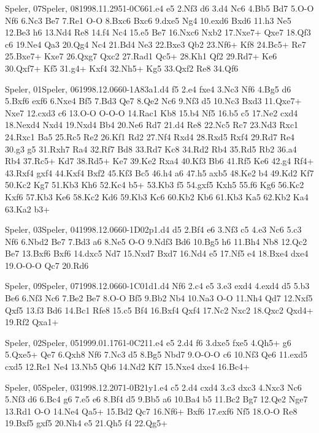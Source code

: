 \documentclass[twocolumn,a4paper,10pt]{report}
\begin{document}
\begin{chessgame}{Speler, 07}{Speler, 08}{1998.11.29}{5}{1-0}{C66}{1.e4 e5 2.Nf3 d6 3.d4 Nc6 4.Bb5 Bd7 5.O-O Nf6 6.Nc3 Be7 7.Re1 O-O 8.Bxc6 Bxc6 9.dxe5 Ng4 10.exd6 Bxd6 11.h3 Ne5 12.Be3 h6 13.Nd4 Re8 14.f4 Nc4 15.e5 Be7 16.Nxc6 Nxb2 17.Nxe7+ Qxe7 18.Qf3 c6 19.Ne4 Qa3 20.Qg4 Nc4 21.Bd4 Ne3 22.Bxe3 Qb2 23.Nf6+ Kf8 24.Bc5+ Re7 25.Bxe7+ Kxe7 26.Qxg7 Qxc2 27.Rad1 Qc5+ 28.Kh1 Qf2 29.Rd7+ Ke6 30.Qxf7+ Kf5 31.g4+ Kxf4 32.Nh5+ Kg5 33.Qxf2 Re8 34.Qf6\mate}\end{chessgame}
\begin{chessgame}{Speler, 01}{Speler, 06}{1998.12.06}{6}{0-1}{A83a}{1.d4 f5 2.e4 fxe4 3.Nc3 Nf6 4.Bg5 d6 5.Bxf6 exf6 6.Nxe4 Bf5 7.Bd3 Qe7 8.Qe2 Nc6 9.Nf3 d5 10.Nc3 Bxd3 11.Qxe7+ Nxe7 12.cxd3 c6 13.O-O O-O-O 14.Rac1 Kb8 15.b4 Nf5 16.b5 c5 17.Ne2 cxd4 18.Nexd4 Nxd4 19.Nxd4 Bb4 20.Ne6 Rd7 21.d4 Re8 22.Nc5 Rc7 23.Nd3 Rxc1 24.Rxc1 Ba5 25.Rc5 Re2 26.Kf1 Rd2 27.Nf4 Rxd4 28.Rxd5 Rxf4 29.Rd7 Re4 30.g3 g5 31.Rxh7 Ra4 32.Rf7 Bd8 33.Rd7 Kc8 34.Rd2 Rb4 35.Rd5 Rb2 36.a4 Rb4 37.Rc5+ Kd7 38.Rd5+ Ke7 39.Ke2 Rxa4 40.Kf3 Bb6 41.Rf5 Ke6 42.g4 Rf4+ 43.Rxf4 gxf4 44.Kxf4 Bxf2 45.Kf3 Bc5 46.h4 a6 47.h5 axb5 48.Ke2 b4 49.Kd2 Kf7 50.Kc2 Kg7 51.Kb3 Kh6 52.Kc4 b5+ 53.Kb3 f5 54.gxf5 Kxh5 55.f6 Kg6 56.Kc2 Kxf6 57.Kb3 Ke6 58.Kc2 Kd6 59.Kb3 Kc6 60.Kb2 Kb6 61.Kb3 Ka5 62.Kb2 Ka4 63.Ka2 b3+}\end{chessgame}
\begin{chessgame}{Speler, 03}{Speler, 04}{1998.12.06}{6}{0-1}{D02p}{1.d4 d5 2.Bf4 e6 3.Nf3 c5 4.e3 Nc6 5.c3 Nf6 6.Nbd2 Be7 7.Bd3 a6 8.Ne5 O-O 9.Ndf3 Bd6 10.Bg5 h6 11.Bh4 Nb8 12.Qc2 Be7 13.Bxf6 Bxf6 14.dxc5 Nd7 15.Nxd7 Bxd7 16.Nd4 e5 17.Nf5 e4 18.Bxe4 dxe4 19.O-O-O Qc7 20.Rd6}\end{chessgame}
\begin{chessgame}{Speler, 09}{Speler, 07}{1998.12.06}{6}{0-1}{C01d}{1.d4 Nf6 2.c4 e5 3.e3 exd4 4.exd4 d5 5.b3 Be6 6.Nf3 Nc6 7.Be2 Be7 8.O-O Bf5 9.Bb2 Nb4 10.Na3 O-O 11.Nh4 Qd7 12.Nxf5 Qxf5 13.f3 Bd6 14.Bc1 Rfe8 15.c5 Bf4 16.Bxf4 Qxf4 17.Nc2 Nxc2 18.Qxc2 Qxd4+ 19.Rf2 Qxa1+}\end{chessgame}
\begin{chessgame}{Speler, 02}{Speler, 05}{1999.01.17}{6}{1-0}{C21}{1.e4 e5 2.d4 f6 3.dxe5 fxe5 4.Qh5+ g6 5.Qxe5+ Qe7 6.Qxh8 Nf6 7.Nc3 d5 8.Bg5 Nbd7 9.O-O-O c6 10.Nf3 Qe6 11.exd5 cxd5 12.Re1 Ne4 13.Nb5 Qb6 14.Nd2 Kf7 15.Nxe4 dxe4 16.Bc4+}\end{chessgame}
\begin{chessgame}{Speler, 05}{Speler, 03}{1998.12.20}{7}{1-0}{B21y}{1.e4 c5 2.d4 cxd4 3.c3 dxc3 4.Nxc3 Nc6 5.Nf3 d6 6.Bc4 g6 7.e5 e6 8.Bf4 d5 9.Bb5 a6 10.Ba4 b5 11.Bc2 Bg7 12.Qe2 Nge7 13.Rd1 O-O 14.Ne4 Qa5+ 15.Bd2 Qc7 16.Nf6+ Bxf6 17.exf6 Nf5 18.O-O Re8 19.Bxf5 gxf5 20.Nh4 e5 21.Qh5 f4 22.Qg5+}\end{chessgame}
\end{document}
